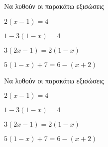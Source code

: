 Να λυθούν οι παρακάτω εξισώσεις
\begin{rlist}
\item $ 2(x-1)=4 $
\item $ 1-3(1-x)=4 $
\item $ 3(2x-1)=2(1-x) $
\item $ 5(1-x)+7=6-(x+2) $
\end{rlist}
Να λυθούν οι παρακάτω εξισώσεις
\begin{rlist}
\item $ 2(x-1)=4 $
\item $ 1-3(1-x)=4 $
\item $ 3(2x-1)=2(1-x) $
\item $ 5(1-x)+7=6-(x+2) $
\end{rlist}
